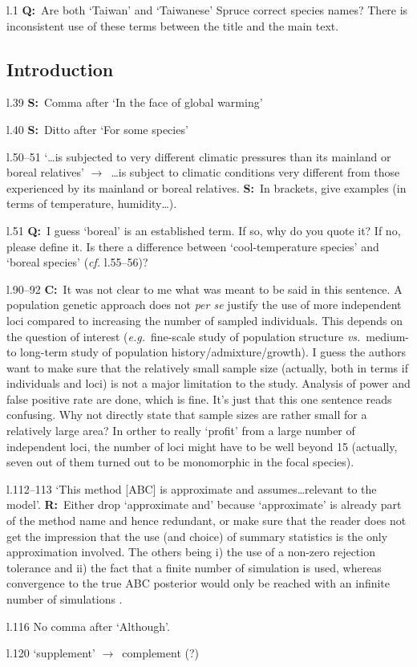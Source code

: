 \documentclass[11pt]{article}
\newenvironment{my_description}
{\begin{description}
  \setlength{\itemsep}{2pt}
  \setlength{\parskip}{0pt}
  \setlength{\parsep}{0pt}}
{\end{description}}
\newcommand{\ra}{$\rightarrow$\ }
\newcommand{\C}{\textbf{C:}\ }
\newcommand{\Q}{\textbf{Q:}\ }
\newcommand{\R}{\textbf{R:}\ }
\newcommand{\V}{\textbf{S:}\ }
\begin{document}
\begin{my_description}
	\item[l.1] \Q Are both `Taiwan' and `Taiwanese' Spruce correct species names? There is inconsistent use of these terms between the title and the main text. 
\end{my_description}

\subsection{Introduction}

\begin{my_description}
	\item[l.39] \V Comma after `In the face of global warming'
	\item[l.40] \V Ditto after `For some species'
	\item[l.50--51] `\dots is subjected to very different climatic pressures than its mainland or boreal relatives' \ra \dots is subject to climatic conditions very different from those experienced by its mainland or boreal relatives. \V In brackets, give examples (in terms of temperature, humidity\dots).
	\item[l.51] \Q I guess `boreal' is an established term. If so, why do you quote it? If no, please define it. Is there a difference between `cool-temperature species' and `boreal species' (\emph{cf.} l.55--56)?
	\item[l.90--92] \C It was not clear to me what was meant to be said in this sentence. A population genetic approach does not \emph{per se} justify the use of more independent loci compared to increasing the number of sampled individuals. This depends on the question of interest (\emph{e.g.}\ fine-scale study of population structure \emph{vs.}\ medium- to long-term study of population history/admixture/growth). I guess the authors want to make sure that the relatively small sample size (actually, both in terms if individuals and loci) is not a major limitation to the study. Analysis of power and false positive rate are done, which is fine. It's just that this one sentence reads confusing. Why not directly state that sample sizes are rather small for a relatively large area? In orther to really `profit' from a large number of independent loci, the number of loci might have to be well beyond 15 (actually, seven out of them turned out to be monomorphic in the focal species).
	\item[l.112--113] `This method [ABC] is approximate and assumes\dots relevant to the model'. \R Either drop `approximate and' because `approximate' is already part of the method name and hence redundant, or make sure that the reader does not get the impression that the use (and choice) of summary statistics is the only approximation involved. The others being i) the use of a non-zero rejection tolerance and ii) the fact that a finite number of simulation is used, whereas convergence to the true ABC posterior would only be reached with an infinite number of simulations \citep[see one of the recent ABC reviews, \emph{e.g.}][]{Beaumont:2010uq}.
	\item[l.116] No comma after `Although'.
	\item[l.120] `supplement' \ra complement (?)


\end{my_description}
\end{document}
